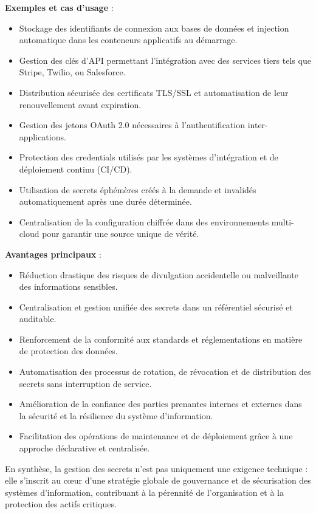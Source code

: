 \textbf{Exemples et cas d’usage} :
\begin{itemize}
	\item Stockage des identifiants de connexion aux bases de données et injection automatique dans les conteneurs applicatifs au démarrage.
	\item Gestion des clés d’API permettant l’intégration avec des services tiers tels que Stripe, Twilio, ou Salesforce.
	\item Distribution sécurisée des certificats TLS/SSL et automatisation de leur renouvellement avant expiration.
	\item Gestion des jetons OAuth 2.0 nécessaires à l’authentification inter-applications.
	\item Protection des credentials utilisés par les systèmes d’intégration et de déploiement continu (CI/CD).
	\item Utilisation de secrets éphémères créés à la demande et invalidés automatiquement après une durée déterminée.
	\item Centralisation de la configuration chiffrée dans des environnements multi-cloud pour garantir une source unique de vérité.
\end{itemize}

\textbf{Avantages principaux} :
\begin{itemize}
	\item Réduction drastique des risques de divulgation accidentelle ou malveillante des informations sensibles.
	\item Centralisation et gestion unifiée des secrets dans un référentiel sécurisé et auditable.
	\item Renforcement de la conformité aux standards et réglementations en matière de protection des données.
	\item Automatisation des processus de rotation, de révocation et de distribution des secrets sans interruption de service.
	\item Amélioration de la confiance des parties prenantes internes et externes dans la sécurité et la résilience du système d’information.
	\item Facilitation des opérations de maintenance et de déploiement grâce à une approche déclarative et centralisée.
\end{itemize}

En synthèse, la gestion des secrets n’est pas uniquement une exigence technique : elle s’inscrit au cœur d’une stratégie globale de gouvernance et de sécurisation des systèmes d’information, contribuant à la pérennité de l’organisation et à la protection des actifs critiques.

